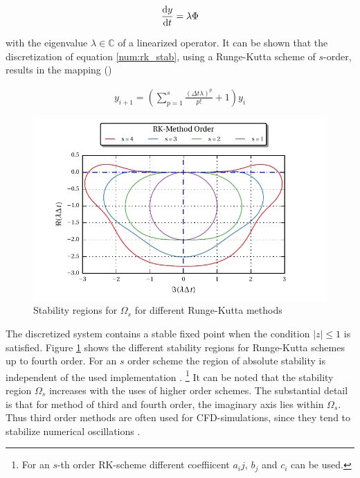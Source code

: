 \begin{align}
\label{num:rk_stab}
\frac{\mathop{}\!\mathrm{d} y}{\mathop{}\!\mathrm{d} t} = \lambda \Phi
\end{align}

with the eigenvalue $\lambda \in \mathbb{C}$ of a linearized operator.
It can be shown that the discretization of equation \ref{num:rk_stab}, using a Runge-Kutta scheme of $s$-order,
results in  the mapping (\citep{BLABLA})

\begin{align}
    y_{i+1}  = \left(\sum_{p=1}^s \frac{(\Delta t \lambda)^p}{p!}  + 1 \right) y_i
\end{align}

\begin{figure}[!tp]
  \begin{minipage}[c]{0.6\textwidth}
      \includegraphics{gfx/numerik/rk_stability.pdf}
  \end{minipage}\hfill
  \begin{minipage}[c]{0.3\textwidth}
  \caption{Stability regions for $\Omega_s$ for different Runge-Kutta methods}
  \label{fig:num_rkstab}
  \end{minipage}
\end{figure}

The discretized system contains a stable fixed point when the condition $|z|\leq 1$ is satisfied.
Figure \ref{fig:num_rkstab} shows the different stability regions for Runge-Kutta schemes up to fourth order.
For an $s$ order scheme the region of absolute stability is independent of the used implementation \citep{BLA}.
\footnote{For an $s$-th order RK-scheme different coeffiicent $a_ij$, $b_j$ and $c_i$ can be used.}
It can be noted that the stability region $\Omega_s$ increases with the uses of higher order schemes.
The substantial detail is that for method of third and fourth order, the imaginary axis lies within $\Omega_s$.
Thus third order methods are often used for CFD-simulations, since they tend to stabilize numerical oscillations \citep{DIPLOM}.


